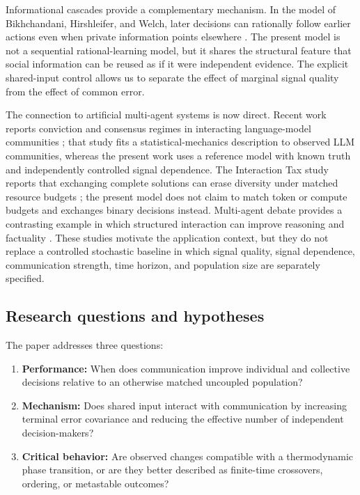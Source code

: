 \documentclass[11pt,a4paper]{article}
\begin{document}
Informational cascades provide a complementary mechanism. In the model of Bikhchandani, Hirshleifer, and Welch, later decisions can rationally follow earlier actions even when private information points elsewhere \citep{bikhchandani1992}. The present model is not a sequential rational-learning model, but it shares the structural feature that social information can be reused as if it were independent evidence. The explicit shared-input control allows us to separate the effect of marginal signal quality from the effect of common error.

The connection to artificial multi-agent systems is now direct. Recent work reports conviction and consensus regimes in interacting language-model communities \citep{physics_of_agents_2026}; that study fits a statistical-mechanics description to observed LLM communities, whereas the present work uses a reference model with known truth and independently controlled signal dependence. The Interaction Tax study reports that exchanging complete solutions can erase diversity under matched resource budgets \citep{interaction_tax_2026}; the present model does not claim to match token or compute budgets and exchanges binary decisions instead. Multi-agent debate provides a contrasting example in which structured interaction can improve reasoning and factuality \citep{du_et_al_2023}. These studies motivate the application context, but they do not replace a controlled stochastic baseline in which signal quality, signal dependence, communication strength, time horizon, and population size are separately specified.

\subsection{Research questions and hypotheses}

The paper addresses three questions:

\begin{enumerate}
  \item \textbf{Performance:} When does communication improve individual and collective decisions relative to an otherwise matched uncoupled population?
  \item \textbf{Mechanism:} Does shared input interact with communication by increasing terminal error covariance and reducing the effective number of independent decision-makers?
  \item \textbf{Critical behavior:} Are observed changes compatible with a thermodynamic phase transition, or are they better described as finite-time crossovers, ordering, or metastable outcomes?
\end{enumerate}
\end{document}
